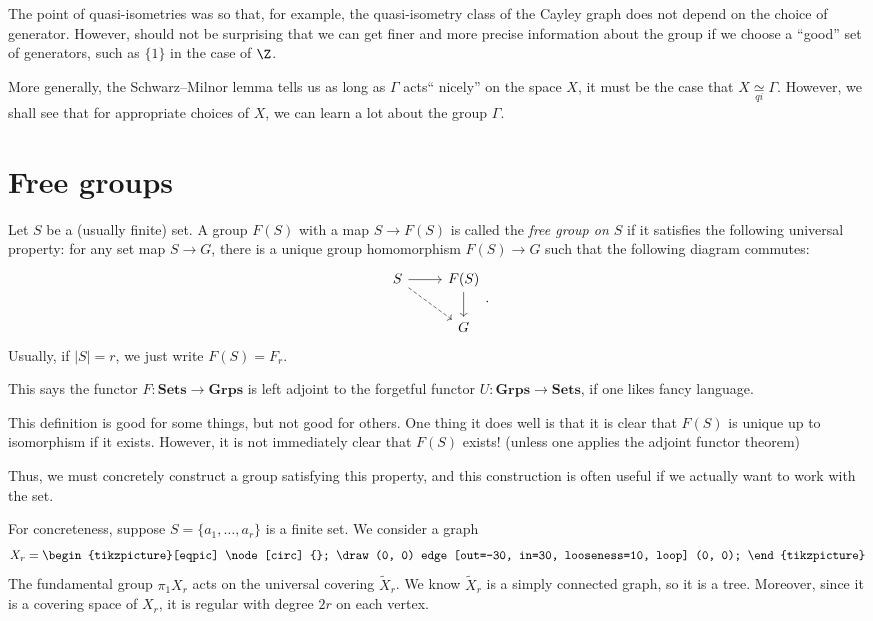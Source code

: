 \documentclass[a4paper]{article}
\newcommand{\qi}{\underset{qi}{\simeq}}
\begin{document}
The point of quasi-isometries was so that, for example, the quasi-isometry class of the Cayley graph does not depend on the choice of generator. However, should not be surprising that we can get finer and more precise information about the group if we choose a ``good'' set of generators, such as $\{1\}$ in the case of $\Z$.

More generally, the Schwarz--Milnor lemma tells us as long as $\Gamma$ acts`` nicely'' on the space $X$, it must be the case that $X \qi \Gamma$. However, we shall see that for appropriate choices of $X$, we can learn a lot about the group $\Gamma$.

\section{Free groups}
\begin{defi}
  Let $S$ be a (usually finite) set. A group $F(S)$ with a map $S \to F(S)$ is called the \emph{free group on $S$} if it satisfies the following universal property: for any set map $S \to G$, there is a unique group homomorphism $F(S) \to G$ such that the following diagram commutes:
  \[
    \begin{tikzcd}
      S \ar[r] \ar[rd, dashed] & F(S) \ar[d]\\
      & G
    \end{tikzcd}.
  \]
  Usually, if $|S| = r$, we just write $F(S) = F_r$.
\end{defi}
This says the functor $F: \mathbf{Sets} \to \mathbf{Grps}$ is left adjoint to the forgetful functor $U: \mathbf{Grps} \to \mathbf{Sets}$, if one likes fancy language.

This definition is good for some things, but not good for others. One thing it does well is that it is clear that $F(S)$ is unique up to isomorphism if it exists. However, it is not immediately clear that $F(S)$ exists! (unless one applies the adjoint functor theorem)

Thus, we must concretely construct a group satisfying this property, and this construction is often useful if we actually want to work with the set.

For concreteness, suppose $S = \{a_1, \ldots, a_r\}$ is a finite set. We consider a graph
\[
  X_r = 
  \begin{tikzpicture}[eqpic]
    \node [circ] {};
    \draw (0, 0) edge [out=-30, in=30, looseness=10, loop] (0, 0);
  \end{tikzpicture}
\]
The fundamental group $\pi_1 X_r$ acts on the universal covering $\tilde{X}_r$. We know $\tilde{X}_r$ is a simply connected graph, so it is a tree. Moreover, since it is a covering space of $X_r$, it is regular with degree $2r$ on each vertex. %
\end{document}
